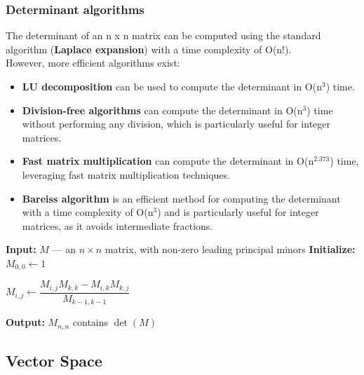 \subsubsection{Determinant algorithms}
The determinant of an n x n matrix can be computed using the standard algorithm (\textbf{Laplace expansion}) with a time complexity of O(n!).\\
However, more efficient algorithms exist:
\begin{itemize}
    \item \textbf{LU decomposition} can be used to compute the determinant in O(n$^3$) time.
    \item \textbf{Division-free algorithms} can compute the determinant in O(n$^3$) time without performing any division, which is particularly useful for integer matrices.
    \item \textbf{Fast matrix multiplication} can compute the determinant in O(n$^{2.373}$) time, leveraging fast matrix multiplication techniques.
    \item \textbf{Bareiss algorithm} is an efficient method for computing the determinant with a time complexity of O(n$^3$) and is particularly useful for integer matrices, as it avoids intermediate fractions.
\end{itemize}

\begin{algorithm}
\caption{Bareiss Algorithm}
\begin{algorithmic}[1]

\State \textbf{Input:} $M$ --- an $n \times n$ matrix, with non-zero leading principal minors
\State \textbf{Initialize:} $M_{0,0} \gets 1$

            \State $M_{i,j} \gets \dfrac{M_{i,j} M_{k,k} - M_{i,k} M_{k,j}}{M_{k-1,k-1}}$
        \EndFor
    \EndFor
\EndFor

\State \textbf{Output:} $M_{n,n}$ contains $\det(M)$

\end{algorithmic}
\end{algorithm}



\subsection{Vector Space}

